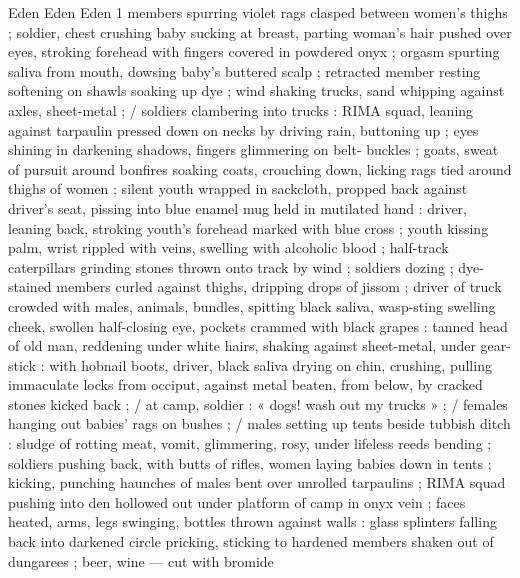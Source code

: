 Eden Eden Eden 1
members spurring violet rags clasped between women's thighs ;
soldier, chest crushing baby sucking at breast, parting woman's hair
pushed over eyes, stroking forehead with fingers covered in
powdered onyx ; orgasm spurting saliva from mouth, dowsing baby's
buttered scalp ; retracted member resting softening on shawls
soaking up dye ; wind shaking trucks, sand whipping against axles,
sheet-metal ; / soldiers clambering into trucks : RIMA squad, leaning
against tarpaulin pressed down on necks by driving rain, buttoning
up ; eyes shining in darkening shadows, fingers glimmering on belt-
buckles ; goats, sweat of pursuit around bonfires soaking coats,
crouching down, licking rags tied around thighs of women ; silent
youth wrapped in sackcloth, propped back against driver's seat,
pissing into blue enamel mug held in mutilated hand : driver, leaning
back, stroking youth's forehead marked with blue cross ; youth
kissing palm, wrist rippled with veins, swelling with alcoholic blood ;
half-track caterpillars grinding stones thrown onto track by wind ;
soldiers dozing ; dye-stained members curled against thighs,
dripping drops of jissom ; driver of truck crowded with males,
animals, bundles, spitting black saliva, wasp-sting swelling cheek,
swollen half-closing eye, pockets crammed with black grapes :
tanned head of old man, reddening under white hairs, shaking
against sheet-metal, under gear-stick : with hobnail boots, driver,
black saliva drying on chin, crushing, pulling immaculate locks from
occiput, against metal beaten, from below, by cracked stones kicked
back ; / at camp, soldier : « dogs! wash out my trucks » ; / females
hanging out babies’ rags on bushes ; / males setting up tents beside
tubbish ditch : sludge of rotting meat, vomit, glimmering, rosy, under
lifeless reeds bending ; soldiers pushing back, with butts of rifles,
women laying babies down in tents ; kicking, punching haunches of
males bent over unrolled tarpaulins ; RIMA squad pushing into den
hollowed out under platform of camp in onyx vein ; faces heated,
arms, legs swinging, bottles thrown against walls : glass splinters
falling back into darkened circle pricking, sticking to hardened
members shaken out of dungarees ; beer, wine — cut with bromide

